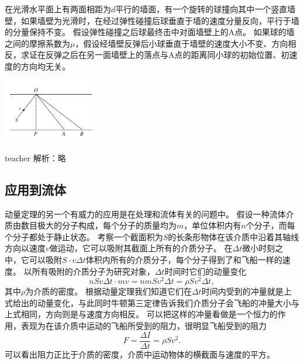\begin{example}
在光滑水平面上有两面相距为$d$平行的墙面，有一个旋转的球撞向其中一个竖直墙壁，如果墙壁为光滑时，在经过弹性碰撞后球垂直于墙的速度分量反向，平行于墙的分量保持不变。
假设弹性碰撞之后球最终击中对面墙壁上的A点。
如果球的墙之间的摩擦系数为$\mu$，假设经墙壁反弹后小球垂直于墙壁的速度大小不变、方向相反，求证在反弹之后在另一面墙壁上的落点与A点的距离同小球的初始位置、初速度的方向均无关。

\begin{flushright}
\includegraphics[width = 0.3\textwidth]{images/momentum-problem-3.pdf} 
\end{flushright}
\begin{taggedblock}{teacher}
\noindent
解析：略
\end{taggedblock}
\end{example}

\subsection{应用到流体}
动量定理的另一个有威力的应用是在处理和流体有关的问题中。
假设一种流体介质由数目极大的分子构成，每个分子的质量均为$m$，单位体积内有$n$个分子，而每个分子都处于静止状态。
考察一个截面积为$S$的长条形物体在该介质中沿着其轴线方向以速度$v$做运动，它可以吸附其截面上所有的介质分子。
在$\Delta t$微小时刻之中，它可以吸附$S\cdot v\Delta t$体积内所有的介质分子，每个分子得到了和飞船一样的速度。
以所有吸附的介质分子为研究对象，$\Delta t$时间时它们的动量变化
\begin{equation}
n  S v \Delta t\cdot mv = nmSv^2\Delta t = \rho S v^2\Delta t,
\end{equation}
其中$\rho$为介质的密度。
根据动量定理我们知道它们在$\Delta t$时间内受到的冲量就是上式给出的动量变化，与此同时牛顿第三定律告诉我们介质分子会飞船的冲量大小与上式相同，方向则是与速度方向相反。
可以把这样的冲量看做是一个恒力的作用，表现为在该介质中运动的飞船所受到的阻力，很明显飞船受到的阻力
\begin{equation}
F = \frac{\Delta I}{\Delta t} =  \rho S v^2.
\end{equation}
可以看出阻力正比于介质的密度，介质中运动物体的横截面与速度的平方。

